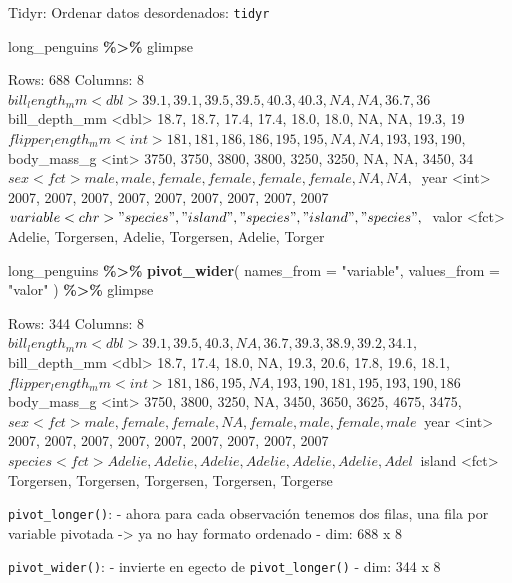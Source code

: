 \documentclass[
  ignorenonframetext,
  aspectratio=169]{beamer}
\newenvironment{Shaded}{\begin{snugshade}}{\end{snugshade}}
\newcommand{\AttributeTok}[1]{\textcolor[rgb]{0.13,0.29,0.53}{#1}}
\newcommand{\FunctionTok}[1]{\textcolor[rgb]{0.13,0.29,0.53}{\textbf{#1}}}
\newcommand{\NormalTok}[1]{#1}
\newcommand{\SpecialCharTok}[1]{\textcolor[rgb]{0.81,0.36,0.00}{\textbf{#1}}}
\newcommand{\StringTok}[1]{\textcolor[rgb]{0.31,0.60,0.02}{#1}}
\let\oldverbatim\verbatim
\let\endoldverbatim\endverbatim
\renewenvironment{verbatim}{\tiny\oldverbatim}{\endoldverbatim}
\begin{document}
\begin{frame}[fragile]{Tidyr: Ordenar datos desordenados:
\texttt{tidyr}}
\label{tidyr-ordenar-datos-desordenados-tidyr-2}
\begin{Shaded}
\begin{Highlighting}[]
\NormalTok{long\_penguins }\SpecialCharTok{\%\textgreater{}\%}\NormalTok{ glimpse}
\end{Highlighting}
\end{Shaded}

\begin{verbatim}
Rows: 688
Columns: 8
$ bill_length_mm    <dbl> 39.1, 39.1, 39.5, 39.5, 40.3, 40.3, NA, NA, 36.7, 36~
$ bill_depth_mm     <dbl> 18.7, 18.7, 17.4, 17.4, 18.0, 18.0, NA, NA, 19.3, 19~
$ flipper_length_mm <int> 181, 181, 186, 186, 195, 195, NA, NA, 193, 193, 190,~
$ body_mass_g       <int> 3750, 3750, 3800, 3800, 3250, 3250, NA, NA, 3450, 34~
$ sex               <fct> male, male, female, female, female, female, NA, NA, ~
$ year              <int> 2007, 2007, 2007, 2007, 2007, 2007, 2007, 2007, 2007~
$ variable          <chr> "species", "island", "species", "island", "species",~
$ valor             <fct> Adelie, Torgersen, Adelie, Torgersen, Adelie, Torger~
\end{verbatim}

\begin{Shaded}
\begin{Highlighting}[]
\NormalTok{long\_penguins }\SpecialCharTok{\%\textgreater{}\%} 
  \FunctionTok{pivot\_wider}\NormalTok{(}
    \AttributeTok{names\_from =} \StringTok{"variable"}\NormalTok{, }\AttributeTok{values\_from =} \StringTok{"valor"}
\NormalTok{  ) }\SpecialCharTok{\%\textgreater{}\%}
\NormalTok{glimpse}
\end{Highlighting}
\end{Shaded}

\begin{verbatim}
Rows: 344
Columns: 8
$ bill_length_mm    <dbl> 39.1, 39.5, 40.3, NA, 36.7, 39.3, 38.9, 39.2, 34.1, ~
$ bill_depth_mm     <dbl> 18.7, 17.4, 18.0, NA, 19.3, 20.6, 17.8, 19.6, 18.1, ~
$ flipper_length_mm <int> 181, 186, 195, NA, 193, 190, 181, 195, 193, 190, 186~
$ body_mass_g       <int> 3750, 3800, 3250, NA, 3450, 3650, 3625, 4675, 3475, ~
$ sex               <fct> male, female, female, NA, female, male, female, male~
$ year              <int> 2007, 2007, 2007, 2007, 2007, 2007, 2007, 2007, 2007~
$ species           <fct> Adelie, Adelie, Adelie, Adelie, Adelie, Adelie, Adel~
$ island            <fct> Torgersen, Torgersen, Torgersen, Torgersen, Torgerse~
\end{verbatim}

\texttt{pivot\_longer()}: - ahora para cada observación tenemos dos
filas, una fila por variable pivotada -\textgreater{} ya no hay formato
ordenado - dim: 688 x 8

\texttt{pivot\_wider()}: - invierte en egecto de
\texttt{pivot\_longer()} - dim: 344 x 8
\end{frame}
\end{document}
